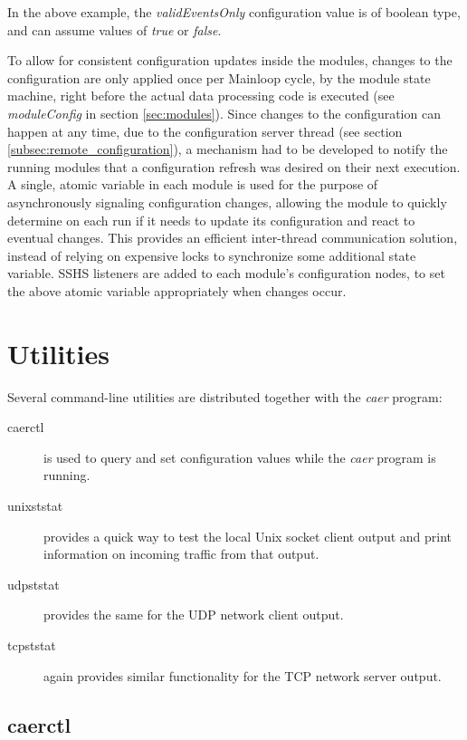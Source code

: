 \documentclass[a4paper,12pt]{report}
\begin{document}
In the above example, the \emph{validEventsOnly} configuration value is of boolean type, and can assume values of \emph{true} or \emph{false}.

To allow for consistent configuration updates inside the modules, changes to the configuration are only applied once per Mainloop cycle, by the module state machine, right before the actual data processing code is executed (see \emph{moduleConfig} in section \ref{sec:modules}).
Since changes to the configuration can happen at any time, due to the configuration server thread (see section \ref{subsec:remote_configuration}), a mechanism had to be developed to notify the running modules that a configuration refresh was desired on their next execution. A single, atomic variable in each module is used for the purpose of asynchronously signaling configuration changes, allowing the module to quickly determine on each run if it needs to update its configuration and react to eventual changes. This provides an efficient inter-thread communication solution, instead of relying on expensive locks to synchronize some additional state variable.
SSHS listeners are added to each module's configuration nodes, to set the above atomic variable appropriately when changes occur.

\section{Utilities} \label{sec:utilities}

Several command-line utilities are distributed together with the \emph{caer} program:
\begin{description}
\item[caerctl] is used to query and set configuration values while the \emph{caer} program is running.
\item[unixststat] provides a quick way to test the local Unix socket client output and print information on incoming traffic from that output.
\item[udpststat] provides the same for the UDP network client output.
\item[tcpststat] again provides similar functionality for the TCP network server output.
\end{description}

\subsection{caerctl} \label{subsec:caerctl}
\end{document}
